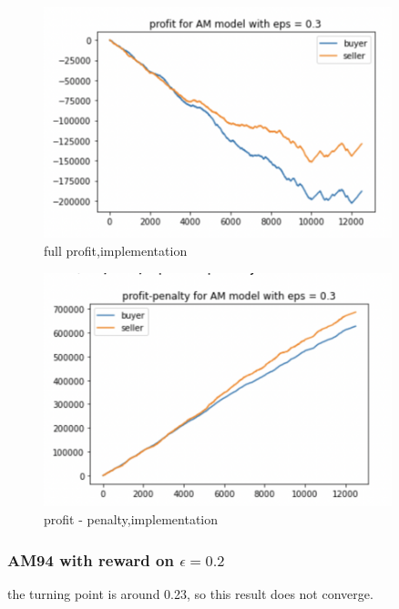 \documentclass[11pt]{article}
\begin{document}
\begin{figure}[H]
	\begin{center}
	\includegraphics[width=0.9\textwidth]{47.PNG}
	\end{center}
	\caption{full profit,implementation}
	\label{FIG.47}
\end{figure}

\begin{figure}[H]
	\begin{center}
	\includegraphics[width=0.9\textwidth]{48.PNG}
	\end{center}
	\caption{profit - penalty,implementation}
	\label{FIG.48}
\end{figure}


\subsubsection{AM94 with reward on $\epsilon = 0.2$}
the turning point is around 0.23, so this result does not converge.
\end{document}
